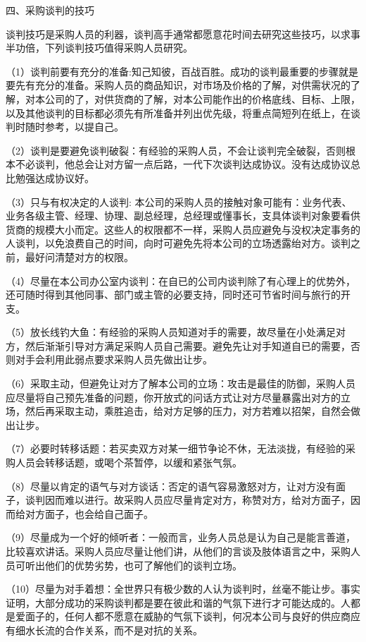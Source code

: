 四、采购谈判的技巧

    谈判技巧是采购人员的利器，谈判高手通常都愿意花时间去研究这些技巧，以求事半功倍，下列谈判技巧值得采购人员研究。

    （1）谈判前要有充分的准备:知己知彼，百战百胜。成功的谈判最重要的步骤就是要先有充分的准备。采购人员的商品知识，对市场及价格的了解，对供需状况的了解，对本公司的了，对供货商的了解，对本公司能作出的价格底线、目标、上限，以及其他谈判的目标都必须先有所准备并列出优先级，将重点简短列在纸上，在谈判时随时参考，以提自己。

    （2）谈判是要避免谈判破裂：有经验的采购人员，不会让谈判完全破裂，否则根本不必谈判，他总会让对方留一点后路，一代下次谈判达成协议。没有达成协议总比勉强达成协议好。

    （3）只与有权决定的人谈判: 本公司的采购人员的接触对象可能有：业务代表、业务各级主管、经理、协理、副总经理，总经理或懂事长，支具体谈判对象要看供货商的规模大小而定。这些人的权限都不一样，采购人员应避免与没权决定事务的人谈判，以免浪费自己的时间，向时可避免先将本公司的立场透露绐对方。谈判之前，最好问清楚对方的权限。

    （4）尽量在本公司办公室内谈判：在自已的公司内谈判除了有心理上的优势外，还可随时得到其他同事、部门或主管的必要支持，同时还可节省时间与旅行的开支。

    （5）放长线钓大鱼：有经验的采购人员知道对手的需要，故尽量在小处满足对方，然后渐渐引导对方满足采购人员自己需要。避免先让对手知道自已的需要，否则对手会利用此弱点要求采购人员先做出让步。

    （6）采取主动，但避免让对方了解本公司的立场：攻击是最佳的防御，采购人员应尽量将自己预先准备的问题，你开放式的问话方式让对方尽量暴露出对方的立场，然后再采取主动，乘胜追击，给对方足够的压力，对方若难以招架，自然会做出让步。

    （7）必要时转移话题：若买卖双方对某一细节争论不休，无法淡拢，有经验的采购人员会转移话题，或喝个茶暂停，以缓和紧张气氛。

    （8）尽量以肯定的语气与对方谈话：否定的语气容易激怒对方，让对方没有面子，谈判因而难以进行。故采购人员应尽量肯定对方，称赞对方，给对方面子，因而给对方面子，也会给自己面子。

    （9）尽量成为一个好的倾听者：一般而言，业务人员总是认为自己是能言善道，比较喜欢讲话。采购人员应尽量让他们讲，从他们的言谈及肢体语言之中，采购人员可听出他们的优势劣势，也可了解他们的谈判立场。

    （10）尽量为对手着想：全世界只有极少数的人认为谈判时，丝毫不能让步。事实证明，大部分成功的采购谈判都是要在彼此和谐的气氛下进行才可能达成的。人都是爱面子的，任何人都不愿意在威胁的气氛下谈判，何况本公司与良好的供应商应有细水长流的合作关系，而不是对抗的关系。

